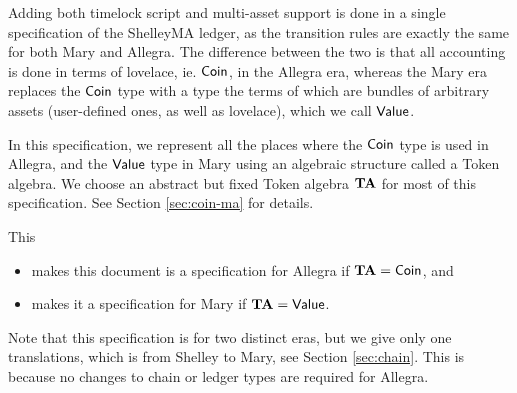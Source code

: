 Adding both timelock script and multi-asset support is done in a single specification
of the ShelleyMA ledger, as the transition rules are exactly the same for both
Mary and Allegra. The difference between the two is that all accounting is
done in terms of lovelace, ie. $\mathsf{Coin}$, in the Allegra era, whereas the Mary era
replaces the $\mathsf{Coin}$ type with a type the terms of which are bundles of arbitrary assets
(user-defined ones, as well as lovelace), which we call $\mathsf{Value}$.

In this specification, we represent all the places where the $\mathsf{Coin}$ type is used in Allegra,
and the $\mathsf{Value}$ type in Mary using an algebraic structure called a Token algebra. We choose
an abstract but fixed Token algebra $\mathbf{TA}$ for most of this specification.
See Section \ref{sec:coin-ma} for details.

This
\begin{itemize}
  \item makes this document is a specification for Allegra if $\mathbf{TA} = \mathsf{Coin}$, and
  \item makes it a specification for Mary if $\mathbf{TA} = \mathsf{Value}$.
\end{itemize}

Note that this specification is for two distinct eras, but we give only one translations, which is
from Shelley to Mary, see Section \ref{sec:chain}. This is because no changes to
chain or ledger types are required for Allegra.
